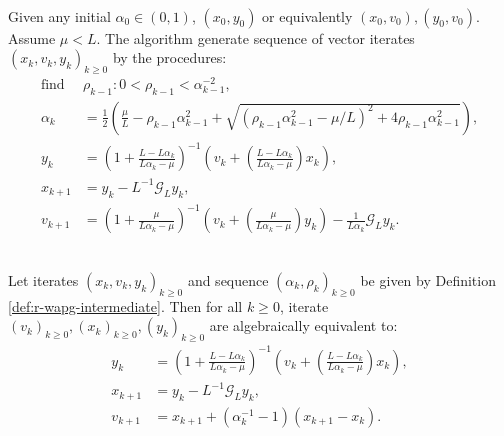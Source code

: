 \documentclass[12pt]{article}
\begin{document}
        \begin{definition}\label{def:r-wapg-intermediate}\;\\
            Given any initial $\alpha_0 \in (0, 1)$, $(x_0, y_0)$ or equivalently $(x_0, v_0), (y_0, v_0)$. 
            Assume $\mu < L$. 
            The algorithm generate sequence of vector iterates $(x_k, v_k, y_k)_{k \ge0}$ by the procedures: 
            \begin{align*}
                \text{find }& \rho_{k - 1}: 0 < \rho_{k - 1} < \alpha_{k - 1}^{-2},
                \\
                \alpha_k &= 
                \frac{1}{2}\left(
                \frac{\mu}{L} - \rho_{k - 1}\alpha_{k - 1}^2 
                +
                \sqrt{(\rho_{k - 1}\alpha_{k - 1}^2 - \mu/L)^2 + 4\rho_{k - 1}\alpha_{k - 1}^2}
                \right), 
                \\
                y_k &= 
                \left(
                    1 + \frac{L - L\alpha_k}{L\alpha_k - \mu}
                \right)^{-1}
                \left(
                    v_k + 
                    \left(\frac{L - L\alpha_k}{L\alpha_k - \mu} \right) x_k
                \right), 
                \\
                x_{k + 1} &= 
                y_k - L^{-1} \mathcal G_L y_k, 
                \\
                v_{k + 1} &= 
                \left(
                    1 + \frac{\mu}{L \alpha_k - \mu}
                \right)^{-1}
                \left(
                    v_k + 
                    \left(\frac{\mu}{L \alpha_k - \mu}\right) y_k
                \right) - \frac{1}{L\alpha_{k}}\mathcal G_L y_k. 
            \end{align*}
        \end{definition}
        \begin{proposition}\label{prop:wagp-st-form}\;\\
            Let iterates $(x_k, v_k, y_k)_{k \ge 0}$ and sequence $(\alpha_k, \rho_k)_{k \ge0}$ be given by Definition \ref{def:r-wapg-intermediate}. 
            Then for all $k \ge0$, iterate $(v_k)_{k \ge 0}, (x_k)_{k \ge 0}, (y_k)_{k \ge0}$ are algebraically equivalent to: 
            \begin{align*}
                y_k &= 
                \left(
                    1 + \frac{L - L\alpha_k}{L\alpha_k - \mu}
                \right)^{-1}
                \left(
                    v_k + 
                    \left(\frac{L - L\alpha_k}{L\alpha_k - \mu} \right) x_k
                \right), 
                \\
                x_{k + 1} &= 
                y_k - L^{-1} \mathcal G_L y_k, 
                \\
                v_{k + 1} &= x_{k + 1} + (\alpha_k^{-1} - 1)(x_{k + 1} - x_k). 
            \end{align*}
        \end{proposition}
\end{document}
